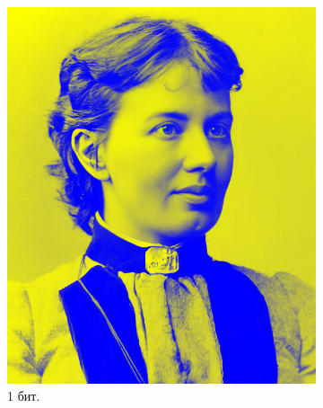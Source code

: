 \documentclass[11pt,a4paper,final]{article} %
\begin{document}
\begin{figure}[h!]
	\centering
	\begin{subfigure}[b]{0.3\linewidth}
		\centering
		\includegraphics[width=\linewidth]{img/sofya2-1-5.jpg}
		\caption{1 бит.}
		\label{fig:s1}
	\end{subfigure}
	\hfill
	\begin{subfigure}[b]{0.3\linewidth}
		\centering

\end{subfigure}
\end{figure}
\end{document}
